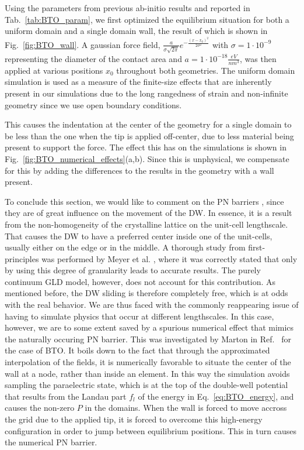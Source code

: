 Using the parameters from previous ab-initio results \cite{Marton2010} and reported in Tab.~\ref{tab:BTO_param}, we first optimized the equilibrium situation for both a uniform domain and a single domain wall, the result of which is shown in Fig.~\ref{fig:BTO_wall}.
A gaussian force field, $\frac{a}{\sigma \sqrt{2\pi}}e^{-\frac{(x-x_0)^2}{2\sigma^2}}$ with $\sigma = 1 \cdot 10^{-9}$ representing the diameter of the contact area and $a = 1 \cdot 10^{-18} \frac{eV}{nm^3}$, was then applied at various positions $x_0$ throughout both geometries.
The uniform domain simulation is used as a measure of the finite-size effects that are inherently present in our simulations due to the long rangedness of strain and non-infinite geometry since we use open boundary conditions.

This causes the indentation at the center of the geometry for a single domain to be less than the one when the tip is applied off-center, due to less material being present to support the force.
The effect this has on the simulations is shown in Fig.~\ref{fig:BTO_numerical_effects}(a,b).
Since this is unphysical, we compensate for this by adding the differences to the results in the geometry with a wall present.

To conclude this section, we would like to comment on the PN barriers \cite{Peierls1940,Nabarro1947}, since they are of great influence on the movement of the DW.
In essence, it is a result from the non-homogeneity of the crystalline lattice on the unit-cell lengthscale.
That causes the DW to have a preferred center inside one of the unit-cells, usually either on the edge or in the middle.
A thorough study from first-principles was performed by Meyer et al. \cite{Meyer2002}, where it was correctly stated that only by using this degree of granularity leads to accurate results.
The purely continuum GLD model, however, does not account for this contribution.
As mentioned before, the DW sliding is therefore completely free, which is at odds with the real behavior.
We are thus faced with the commonly reappearing issue of having to simulate physics that occur at different lengthscales.
In this case, however, we are to some extent saved by a spurious numerical effect that mimics the naturally occuring PN barrier.
This was investigated by Marton in Ref.~\cite{Marton2018} for the case of BTO.
It boils down to the fact that through the approximated interpolation of the fields, it is numerically favorable to situate the center of the wall at a node, rather than inside an element.
In this way the simulation avoids sampling the paraelectric state, which is at the top of the double-well potential that results from the Landau part $f_l$ of the energy in Eq.~\ref{eq:BTO_energy}, and causes the non-zero $P$ in the domains.
When the wall is forced to move accross the grid due to the applied tip, it is forced to overcome this high-energy configuration in order to jump between equilibrium positions.
This in turn causes the numerical PN barrier.

